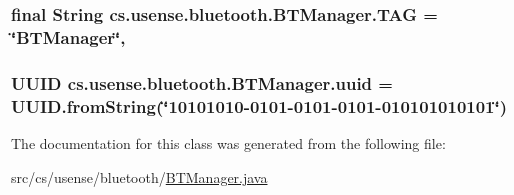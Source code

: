 \subsubsection[{T\+A\+G}]{\setlength{\rightskip}{0pt plus 5cm}final String cs.\+usense.\+bluetooth.\+B\+T\+Manager.\+T\+A\+G = \char`\"{}B\+T\+Manager\char`\"{}\hspace{0.3cm}{\ttfamily [static]}, {\ttfamily [private]}}\label{classcs_1_1usense_1_1bluetooth_1_1_b_t_manager_a64c930ada22e67f8a41555c063c466d9}
\hypertarget{classcs_1_1usense_1_1bluetooth_1_1_b_t_manager_a15181a6e41bb0031cded5d0888074c73}{}
\subsubsection[{uuid}]{\setlength{\rightskip}{0pt plus 5cm}U\+U\+I\+D cs.\+usense.\+bluetooth.\+B\+T\+Manager.\+uuid = U\+U\+I\+D.\+from\+String(\char`\"{}10101010-\/0101-\/0101-\/0101-\/010101010101\char`\"{})\hspace{0.3cm}{\ttfamily [private]}}\label{classcs_1_1usense_1_1bluetooth_1_1_b_t_manager_a15181a6e41bb0031cded5d0888074c73}


The documentation for this class was generated from the following file\+:\begin{DoxyCompactItemize}
\item 
src/cs/usense/bluetooth/\hyperlink{_b_t_manager_8java}{B\+T\+Manager.\+java}\end{DoxyCompactItemize}
